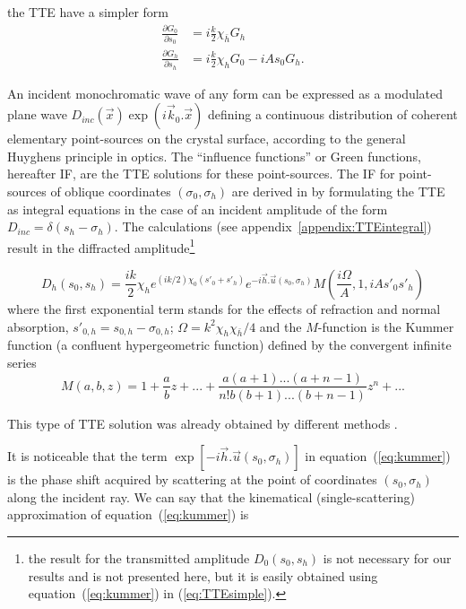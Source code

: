 \documentclass[preprint]{iucr}              %
\begin{document}
the TTE have a simpler form
\begin{subequations}
    \label{eq:TTEsimple}
    \begin{align}
      \frac{\partial G_0}{\partial s_0} &= i \frac{k}{2}\chi_{\bar{h}} G_h
      \\
      \frac{\partial G_h}{\partial s_h} &= i \frac{k}{2}\chi_{h} G_0 - i A s_0 G_h.
    \end{align}
\end{subequations}

An incident monochromatic wave of any form can be expressed as a modulated plane wave $D_{inc}(\vec x)\exp(i \vec k_0 . \vec x)$ defining a continuous distribution of coherent elementary point-sources on the crystal surface, according to the general Huyghens principle in optics. The “influence functions” or Green functions, hereafter IF, are the TTE solutions for these point-sources. 
The IF for point-sources of oblique coordinates $(\sigma_0,\sigma_h)$
are derived in \cite{GuigayFerrero2016} by formulating the TTE  as integral equations in the case of an incident amplitude of the form $D_{inc}=\delta(s_h-\sigma_h)$. 
The calculations (see appendix~\ref{appendix:TTEintegral}) result in the diffracted amplitude\footnote{the result for the transmitted amplitude $D_0(s_0,s_h)$ is not necessary for our results and is not presented here, but it is easily obtained using equation~(\ref{eq:kummer}) in (\ref{eq:TTEsimple}).}

  
\begin{equation}
\label{eq:kummer}
    D_h(s_0,s_h) = \frac{i k }{2} \chi_h e^{(ik/2) \chi_0 (s'_0 + s'_h)} e^{-i \vec h . \vec u (s_0,\sigma_h)} M(\frac{i\Omega}{A},1,iA s'_0 s'_h)
\end{equation}
where the first exponential term stands for the effects of refraction and normal absorption, $s'_{0,h}=s_{0,h}-\sigma_{0,h}$; $\Omega=k^2\chi_h\chi_{\bar{h}}/4$ and the $M$-function is the Kummer function (a confluent hypergeometric function) defined by the convergent infinite series
\begin{equation}
\label{eq:kummerSeries}
    M(a,b,z) = 1 + \frac{a}{b} z + 
    ... + \frac{a(a+1)...(a+n-1)}{n! b (b+1)...(b+n-1)}z^n+...
\end{equation}

This type of TTE solution was already obtained by different methods \cite{Petrashen1974,Katagawa1974,Litzmann1974,Chukhovski1977}.

It is noticeable that the term $\exp[-i\vec h . \vec u (s_0,\sigma_h)]$ in equation~(\ref{eq:kummer}) is the phase shift acquired by scattering at the point of coordinates $(s_0,\sigma_h)$ along the incident ray. We can say that the kinematical (single-scattering) approximation of equation~(\ref{eq:kummer}) is 
\end{document}
